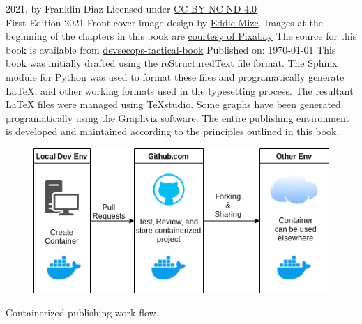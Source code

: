 \justifying
\textcopyright{} 2021, by Franklin Diaz
\justifying
Licensed under \href{https://creativecommons.org/licenses/by-nc-nd/4.0/}{CC BY-NC-ND 4.0} 
\faCreativeCommons\ \faCreativeCommonsBy\ \faCreativeCommonsSa\
\vspace{5mm}\\
First Edition 2021
\justifying
Front cover image design by {\href{https://www.linkedin.com/in/eddiemize/}{Eddie Mize}}.
Images at the beginning of the chapters in this book are
\href{https://pixabay.com/service/terms/#license}{courtesy of Pixabay}
\justifying
The source for this book is available from 
{\href{https://github.com/thedevilsvoice/devsecops-tactical-book}{devsecops-tactical-book}}
\vspace{3mm}
Published on: \today
\justifying
This book was initially drafted using the reStructuredText file format.
The Sphinx module for Python was used to format these files and programatically
generate LaTeX, and other working formats used in the typesetting process. The
resultant LaTeX files were managed using TeXstudio.
\justifying
Some graphs have been generated programatically using the Graphviz software.
The entire publishing environment is developed and maintained according
to the principles outlined in this book.
\vspace{5mm}
\centering
\vspace{0mm}
\begin{figure}[!htb]
	\centering
	\includegraphics[scale=0.75]{images/workflow.png}
\end{figure}
\vspace{2mm}
Containerized publishing work flow.
